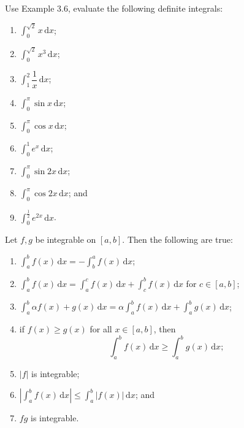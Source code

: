 \documentclass[11pt]{article}
\theoremstyle{break}
\theoremstyle{no_label}
\newcommand{\ddi}{\text{$\,$d}}
\numberwithin{equation}{theorem}
\begin{document}
\begin{exercise}
    Use Example 3.6, evaluate the following definite integrals:\vspace{-1.8em}
    \begin{multicols}{3}
        \begin{enumerate}
            \item $\displaystyle\int_0^{\sqrt{2}} x\ddi x$;
            \item $\displaystyle\int_0^{\sqrt{2}} x^3\ddi x$;
            \item $\displaystyle\int_1^2 \dfrac{1}{x}\ddi x$;
            \item $\displaystyle\int_0^\pi \sin x\ddi x$;
            \item $\displaystyle\int_0^\pi \cos x\ddi x$;
            \item $\displaystyle\int_0^1 e^x\ddi x$;
            \item $\displaystyle\int_0^\pi \sin 2x\ddi x$;
            \item $\displaystyle\int_0^\pi \cos 2x\ddi x$; and
            \item $\displaystyle\int_0^{\frac{1}{2}} e^{2x}\ddi x$.
        \end{enumerate}
    \end{multicols}\vspace{0.1em}
\end{exercise}



\begin{theorem}
    Let $f, g$ be integrable on $[a, b]$. Then the following are true:
    \begin{enumerate}
        \item $\displaystyle\int_a^b f(x)\ddi x=-\int_b^a f(x)\ddi x$;
        \item $\displaystyle\int_a^b f(x)\ddi x=\int_a^c f(x)\ddi x+\int_c^b f(x)\ddi x$ for $c\in[a, b]$;
        \item $\displaystyle\int_a^b \alpha f(x)+g(x)\ddi x=\alpha\int_a^b f(x)\ddi x+\int_a^b g(x)\ddi x$;
        \item if $f(x)\geq g(x)$ for all $x\in[a, b]$, then $$\int_a^b f(x)\ddi x\geq\int_a^b g(x)\ddi x;$$
        \item $|f|$ is integrable;
        \item $\displaystyle\left|\int_a^b f(x)\ddi x\right|\leq\int_a^b |f(x)|\ddi x$; and
        \item $fg$ is integrable.
    \end{enumerate}
\end{theorem}
\end{document}
